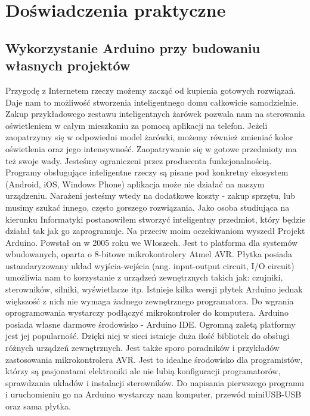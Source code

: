 \documentclass[brudnopis]{xmgr}
\begin{document}
\chapter{Doświadczenia praktyczne}

\section{Wykorzystanie Arduino przy budowaniu własnych projektów}

Przygodę z Internetem rzeczy możemy zacząć od kupienia gotowych rozwiązań. Daje nam to możliwość stworzenia inteligentnego domu całkowicie samodzielnie. Zakup przykładowego zestawu inteligentnych żarówek pozwala nam na sterowania oświetleniem w całym mieszkaniu za pomocą aplikacji na telefon. Jeżeli zaopatrzymy się w odpowiedni model żarówki, możemy również zmieniać kolor oświetlenia oraz jego intensywność. 
Zaopatrywanie się w gotowe przedmioty ma też swoje wady. Jesteśmy ograniczeni przez producenta funkcjonalnością. Programy obsługujące inteligentne rzeczy są pisane pod konkretny ekosystem (Android, iOS, Windows Phone) aplikacja może nie działać na naszym urządzeniu. Narażeni jesteśmy wtedy na dodatkowe koszty - zakup sprzętu, lub musimy szukać innego, często gorszego rozwiązania. Jako osoba studiująca na kierunku Informatyki postanowiłem stworzyć inteligentny przedmiot, który będzie działał tak jak go zaprogramuje. 
Na przeciw moim oczekiwaniom wyszedł Projekt Arduino. Powstał on w 2005 roku we Włoszech. Jest to platforma dla systemów wbudowanych, oparta o 8-bitowe mikrokontrolery Atmel AVR. Płytka posiada ustandaryzowany układ wyjścia-wejścia (ang. input-output circuit, I/O circuit) umożliwia nam  to korzystanie z urządzeń zewnętrznych takich jak: czujniki, sterowników, silniki, wyświetlacze itp. Istnieje kilka wersji płytek Arduino jednak większość z nich nie wymaga żadnego zewnętrznego programatora. Do wgrania oprogramowania wystarczy podłączyć mikrokontroler do komputera. Arduino posiada własne darmowe środowisko - Arduino IDE. Ogromną zaletą platformy jest jej popularność. Dzięki niej w sieci istnieje duża ilość bibliotek do obsługi różnych urządzeń zewnętrznych. Jest także sporo poradników i przykładów zastosowania mikrokontrolera AVR.
Jest to idealne środowisko dla programistów, którzy są pasjonatami elektroniki ale nie lubią konfiguracji programatorów, sprawdzania układów i instalacji sterowników. Do napisania pierwszego programu i uruchomieniu go na Arduino wystarczy nam komputer, przewód miniUSB-USB oraz sama płytka. 
\end{document}
